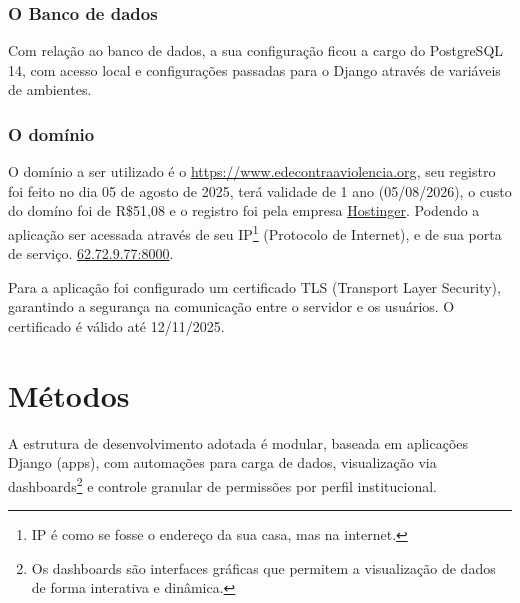 \subsubsection{O Banco de dados}
\par Com relação ao banco de dados, a sua configuração ficou a cargo do PostgreSQL 14, com acesso local e configurações passadas para o Django através de variáveis de ambientes.

\subsubsection{O domínio}
\par O domínio a ser utilizado é o \href{https://www.redecontraaviolencia.org}{https://www.edecontraaviolencia.org}, seu registro foi feito no dia 05 de agosto de 2025, terá validade de 1 ano (05/08/2026), o custo do domíno foi de R\$51,08 e o registro foi pela empresa \href{https://www.hostinger.com/br}{Hostinger}. Podendo a aplicação ser acessada através de seu IP\footnote{IP é como se fosse o endereço da sua casa, mas na internet.} (Protocolo de Internet), e de sua porta de serviço. \href{62.72.9.77:8000}{62.72.9.77:8000}.
\par Para a aplicação foi configurado um certificado TLS (Transport Layer Security), garantindo a segurança na comunicação entre o servidor e os usuários. O certificado é válido até 12/11/2025.


\section{Métodos}

A estrutura de desenvolvimento adotada é modular, baseada em aplicações Django (apps), com automações para carga de dados, visualização via dashboards\footnote{Os dashboards são interfaces gráficas que permitem a visualização de dados de forma interativa e dinâmica.} e controle granular de permissões por perfil institucional.

